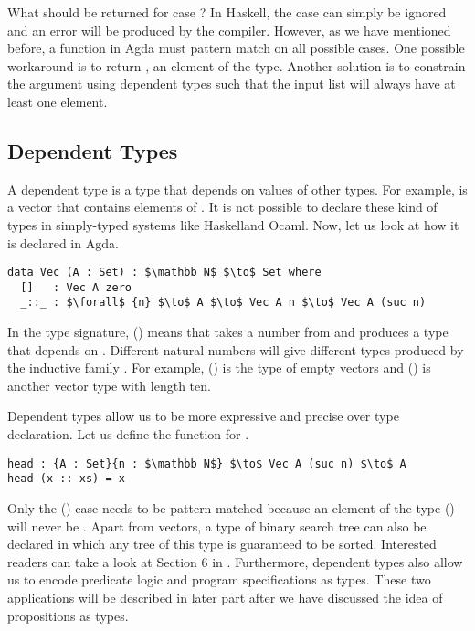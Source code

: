 \par What should be returned for case \mb{[\ ]}? In Haskell, the \mb{[\
  ]} case can simply be ignored and an error will be produced by the
compiler. However, as we have mentioned
before, a function in Agda must pattern match on all possible cases. One
possible workaround is to return \mb{nothing}, an element of the
\mb{Maybe} type. Another solution is
to constrain the argument using dependent types such that the input
list will always have at least one element. 


\subsection{Dependent Types}
\par A dependent type is a type that depends on values of other
types. For example,  is a vector that contains  elements
of \mb{A}. It is not possible to declare these kind of types in
simply-typed systems like Haskell\footnotemark and Ocaml. Now, let
us look at how it is declared in Agda.
\begin{lstlisting}[mathescape=true,xleftmargin=.3\textwidth]
data Vec (A : Set) : $\mathbb N$ $\to$ Set where
  []   : Vec A zero
  _::_ : $\forall$ {n} $\to$ A $\to$ Vec A n $\to$ Vec A (suc n)
\end{lstlisting} 

\par In the type signature, () means
that  takes a number  from  and produces a
type that depends on \mb{n}. Different natural
numbers will give different types produced by the inductive family . For example, () is
the type of empty vectors and (\mb{Vec\ A\ 10}) is another vector type with length ten. 

\par Dependent types allow us to be more
expressive and precise over type declaration. Let us define the
 function for . 
\begin{lstlisting}[mathescape=true,xleftmargin=.3\textwidth]
head : {A : Set}{n : $\mathbb N$} $\to$ Vec A (suc n) $\to$ A
head (x :: xs) = x 
\end{lstlisting} 

\par Only the () case needs to be pattern matched because
an element of the type (\mb{Vec\ A\ (suc\ n)}) will never
be \mb{[\ ]}. Apart from vectors, a type of binary
search tree can also be declared in which any tree of this type is guaranteed to be
sorted. Interested readers can take a look at 
Section 6 in \cite{bove2009}. Furthermore, dependent types also allow
us to encode predicate logic and program specifications as
types. These two applications will be described in later part after we
have discussed the idea of propositions as types. 


